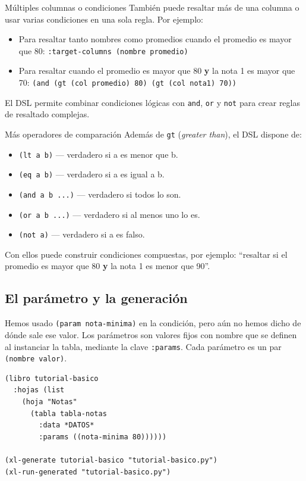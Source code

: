 \documentclass[12pt,a4paper]{report}
\begin{document}
\begin{infobox}{Múltiples columnas o condiciones}
  También puede resaltar más de una columna o usar varias condiciones
  en una sola regla.  Por ejemplo:
  \begin{itemize}
    \item Para resaltar tanto nombres como promedios cuando el promedio
      es mayor que 80: \texttt{:target-columns (nombre promedio)}
    \item Para resaltar cuando el promedio es mayor que 80 \textbf{y}
      la nota 1 es mayor que 70: \texttt{(and (gt (col promedio) 80)
      (gt (col nota1) 70))}
  \end{itemize}
  El DSL permite combinar condiciones lógicas con \texttt{and},
  \texttt{or} y \texttt{not} para crear reglas de resaltado complejas.
\end{infobox}

\begin{infobox}{Más operadores de comparación}
  Además de \texttt{gt} ({\itshape greater than}), el DSL dispone de:
  \begin{itemize}
    \item \texttt{(lt a b)} --- verdadero si a es menor que b.
    \item \texttt{(eq a b)} --- verdadero si a es igual a b.
    \item \texttt{(and a b ...)} --- verdadero si todos lo son.
    \item \texttt{(or a b ...)} --- verdadero si al menos uno lo es.
    \item \texttt{(not a)} --- verdadero si a es falso.
  \end{itemize}
  Con ellos puede construir condiciones compuestas, por ejemplo:
  ``resaltar si el promedio es mayor que 80 {\bf y} la nota 1 es menor
  que 90''.
\end{infobox}

\subsection{El parámetro y la generación}

Hemos usado \texttt{(param nota-minima)} en la condición, pero aún no
hemos dicho de dónde sale ese valor.  Los parámetros son valores fijos
con nombre que se definen al instanciar la tabla, mediante la clave
\texttt{:params}.  Cada parámetro es un par \texttt{(nombre valor)}.

\begin{lstlisting}[caption={Libro completo con parámetros.}]
(libro tutorial-basico
  :hojas (list
    (hoja "Notas"
      (tabla tabla-notas
        :data *DATOS*
        :params ((nota-minima 80))))))

(xl-generate tutorial-basico "tutorial-basico.py")
(xl-run-generated "tutorial-basico.py")
\end{lstlisting}
\end{document}
